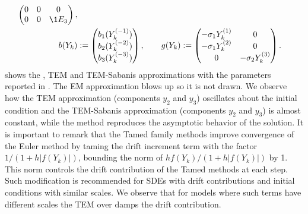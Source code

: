 \begin{example}
\begin{align}
\begin{pmatrix}
			0		&0			&0\\
			0		&0			&\1{E_3}\\
		\end{pmatrix},
	\notag
	\\
	b(Y_k) &:=
	\begin{pmatrix}
		b_1(Y_k^{(-1)})\\
		b_2(Y_k^{(-2)})\\
		b_3(Y_k^{(-3)})
	\end{pmatrix},
	\qquad
	g(Y_k):=
	\begin{pmatrix}
		-\sigma_1 Y_k^{(1)}	&0\\
		-\sigma_1 Y_k^{(2)}	&0\\
		0	&-\sigma_2 Y_k^{(3)}
	\end{pmatrix}.
\end{align}
%
	 shows the  \SM, TEM and TEM-Sabanis approximations
	with the parameters reported in \cite{Dalal2008}.  The EM approximation
	blows up  so it is not drawn. We observe how the TEM approximation (components $y_2$ and $y_3$) oscillates about 
	the initial condition and the 
	TEM-Sabanis approximation (components $y_2$ and $y_3$) is almost constant, while the 
	\SM method reproduces the asymptotic behavior of the solution. It is important to remark that the Tamed family 
	methods improve convergence of the Euler method by taming the drift increment term with 
	the factor	$1/(1 + h |f(Y_k)|)$, bounding the norm of  $h f(Y_k)/(1 + h |f(Y_k)|)$ by 1. This norm   
	controls the drift contribution of the Tamed methods  at each step. Such modification 
	is recommended for SDEs with drift contributions and initial conditions with similar scales. We observe
	that for models where such terms have different scales the TEM over damps the drift contribution. 
\end{example}

